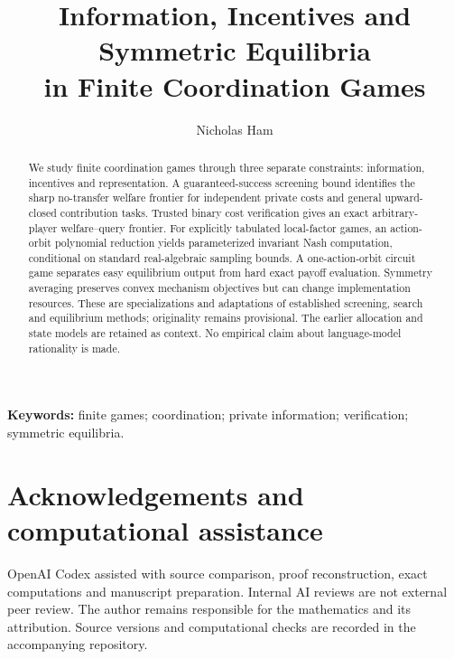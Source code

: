 \documentclass[11pt]{article}
\title{Information, Incentives and Symmetric Equilibria\\in Finite Coordination Games}
\author{Nicholas Ham}
\date{}
\begin{document}
\maketitle
\begin{abstract}
We study finite coordination games through three separate constraints:
information, incentives and representation. A guaranteed-success screening
bound identifies the sharp no-transfer welfare frontier for independent
private costs and general upward-closed contribution tasks. Trusted binary
cost verification gives an exact arbitrary-player welfare--query frontier.
For explicitly tabulated local-factor games, an action-orbit polynomial
reduction yields parameterized invariant Nash computation, conditional on
standard real-algebraic sampling bounds. A one-action-orbit circuit game
separates easy equilibrium output from hard exact payoff evaluation.
Symmetry averaging preserves convex mechanism objectives but can change
implementation resources. These are specializations and adaptations of
established screening, search and equilibrium methods; originality remains
provisional. The earlier allocation and state models are retained as context.
No empirical claim about language-model rationality is made.
\end{abstract}
\noindent\textbf{Keywords:} finite games; coordination; private information;
verification; symmetric equilibria.








\section*{Acknowledgements and computational assistance}
OpenAI Codex assisted with source comparison, proof reconstruction, exact
computations and manuscript preparation. Internal AI reviews are not external
peer review. The author remains responsible for the mathematics and its
attribution. Source versions and computational checks are recorded in the
accompanying repository.
\begingroup\small
{}


\endgroup
\end{document}
